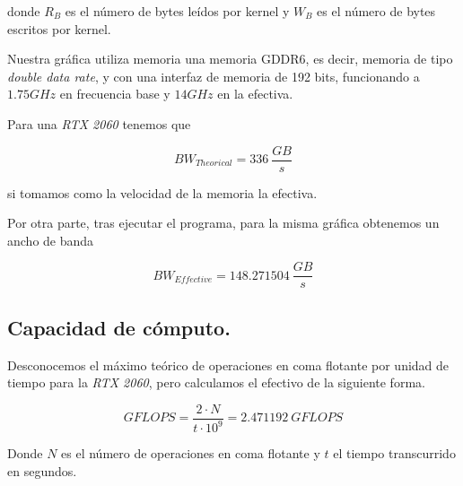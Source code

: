 donde $R_{B}$ es el número de bytes leídos por kernel y $W_{B}$ es el número de bytes
escritos por kernel.

\pagebreak

Nuestra gráfica utiliza memoria una memoria GDDR6, es decir, memoria de tipo \textit{double data rate},
y con una interfaz de memoria de 192 bits, funcionando a $1.75GHz$ en frecuencia base y $14GHz$ en la efectiva.

Para una \textit{RTX 2060} tenemos que

$$ BW_{Theorical} = 336 \ \frac{GB}{s} $$

si tomamos como la velocidad de la memoria la efectiva.

Por otra parte, tras ejecutar el programa, para la misma gráfica obtenemos un ancho de banda

$$ BW_{Effective} = 148.271504 \ \frac{GB}{s} $$

\subsection{Capacidad de cómputo.}

Desconocemos el máximo teórico de operaciones en coma flotante por unidad de tiempo para la \textit{RTX 2060}, pero calculamos el efectivo de la siguiente forma.

$$ GFLOPS = \frac{2 \cdot N}{t \cdot 10^{9}} = 2.471192 \ GFLOPS $$

Donde $N$ es el número de operaciones en coma flotante y $t$ el tiempo transcurrido en segundos.

